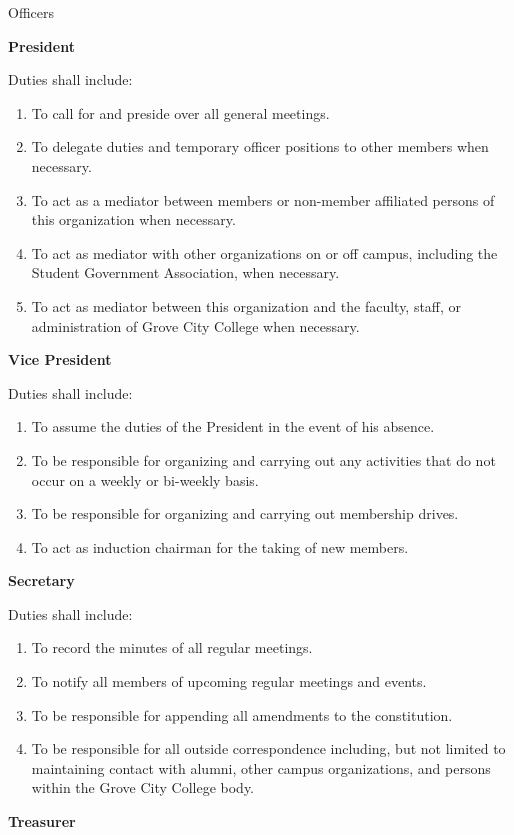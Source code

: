{
	\begin{article}{Officers}
		\item \textbf{President}
		
		Duties shall include:
		\begin{enumerate}
			\item To call for and preside over all general meetings.
			\item To delegate duties and temporary officer positions to other members when necessary.
			\item To act as a mediator between members or non-member affiliated persons of this organization when necessary.
			\item To act as mediator with other organizations on or off campus, including the Student Government Association, when necessary. 
			\item To act as mediator between this organization and the faculty, staff, or administration of Grove City College when necessary.
		\end{enumerate}
		\item \textbf{Vice President}
		
		Duties shall include:
		\begin{enumerate}
			\item To assume the duties of the President in the event of his absence.
			\item To be responsible for organizing and carrying out any activities that do not occur on a weekly or bi-weekly basis.
			\item To be responsible for organizing and carrying out membership drives.
			\item To act as induction chairman for the taking of new members.
		\end{enumerate}
		\item \textbf{Secretary}
		
		Duties shall include:
		\begin{enumerate}
			\item To record the minutes of all regular meetings.
			\item To notify all members of upcoming regular meetings and events.
			\item To be responsible for appending all amendments to the constitution.
			\item To be responsible for all outside correspondence including, but not limited to maintaining contact with alumni, other campus organizations, and persons within the Grove City College body.
		\end{enumerate}
		\item \textbf{Treasurer}
		

\end{article}}
